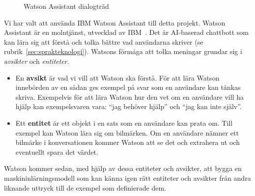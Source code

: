 \documentclass[a4paper,12pt]{article}
\begin{document}
\begin{figure}[htb]
  \centering
  \smallskip
  \smallskip
  \caption{Watson Assistant dialogträd}
  \label{fig:watson:dialog-tree}
\end{figure}

Vi har valt att använda IBM Watson Assistant till detta projekt.
Watson Assistant är en molntjänst, utvecklad av IBM~\cite{web:watson-assistant}. Det är AI-baserad chattbott som kan lära sig att förstå och tolka bättre vad användarna skriver (se rubrik~\ref{sec:sprakteknologi}). Watsons förmåga att tolka meningar grundar sig i \emph{avsikter} och \emph{entiteter}.

\begin{itemize}
    \item En \textbf{avsikt} är vad vi vill att Watson ska förstå. För att lära Watson innebörden av en sådan ges exempel på svar som en användare kan tänkas skriva. Exempelvis för att lära Watson hur den vet om en användare vill ha hjälp kan exempelsvaren vara: ``jag behöver hjälp'' och ``jag kan inte själv''.
    
    \item Ett \textbf{entitet} är ett objekt i en sats som en användare kan prata om. Till exempel kan Watson lära sig om bilmärken. Om en användare nämner ett bilmärke i konversationen kommer Watson att se det och extrahera ut och eventuellt spara det värdet.
\end{itemize}
Watson kommer sedan, med hjälp av dessa entiteter och avsikter, att bygga en maskininlärningsmodell som kan känna igen rätt entiteter och avsikter från andra liknande uttryck till de exempel som definierade dem.
\end{document}
